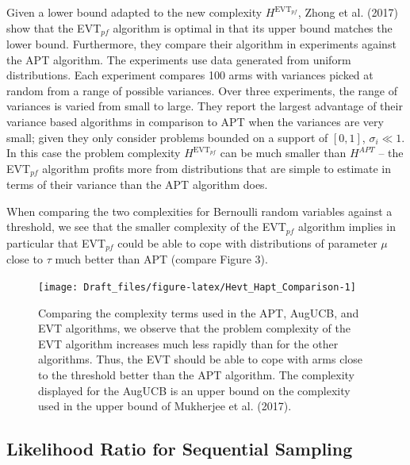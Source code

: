 \documentclass[11pt,]{article}
\begin{document}
Given a lower bound adapted to the new complexity
\(H^{\text{EVT}_{pf}}\), Zhong et al. (2017) show that the EVT\(_{pf}\)
algorithm is optimal in that its upper bound matches the lower bound.
Furthermore, they compare their algorithm in experiments against the APT
algorithm. The experiments use data generated from uniform
distributions. Each experiment compares 100 arms with variances picked
at random from a range of possible variances. Over three experiments,
the range of variances is varied from small to large. They report the
largest advantage of their variance based algorithms in comparison to
APT when the variances are very small; given they only consider problems
bounded on a support of \([0,1]\), \(\sigma_i \ll 1\). In this case the
problem complexity \(H^{\text{EVT}_{pf}}\) can be much smaller than
\(H^{APT}\) -- the EVT\(_{pf}\) algorithm profits more from
distributions that are simple to estimate in terms of their variance
than the APT algorithm does.

When comparing the two complexities for Bernoulli random variables
against a threshold, we see that the smaller complexity of the
EVT\(_{pf}\) algorithm implies in particular that EVT\(_{pf}\) could be
able to cope with distributions of parameter \(\mu\) close to \(\tau\)
much better than APT (compare Figure 3).

\begin{figure}

{\centering \texttt{[image: Draft\_files/figure-latex/Hevt\_Hapt\_Comparison-1]} 

}

\caption{Comparing the complexity terms used in the APT, AugUCB, and EVT algorithms, we observe that the problem complexity of the EVT algorithm increases much less rapidly than for the other algorithms. Thus, the EVT should be able to cope with arms close to the threshold better than the APT algorithm. The complexity displayed for the AugUCB is an upper bound on the complexity used in the upper bound of Mukherjee et al. (2017).}\label{fig:Hevt_Hapt_Comparison}
\end{figure}

\subsection{\texorpdfstring{Likelihood Ratio for Sequential Sampling
\label{sec:LikelihoodRatioForExponentialFamily}}{Likelihood Ratio for Sequential Sampling }}\label{likelihood-ratio-for-sequential-sampling}
\end{document}
